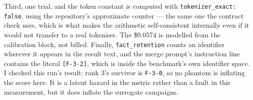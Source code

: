 \documentclass[11pt]{article}
\begin{document}
Third, one trial, and the token constant is computed with \texttt{tokenizer\_exact:
false}, using the repository's approximate counter --- the same one the contract check
uses, which is what makes the arithmetic self-consistent internally even if it would not
transfer to a real tokeniser. The \$0.0574 is modelled from the calibration block, not
billed. Finally, \texttt{fact\_retention} counts an identifier wherever it appears in the
result text, and the merge prompt's instruction line contains the literal
\texttt{[F-3-2]}, which is inside the benchmark's own identifier space. I checked this
run's result: rank 3's survivor is \texttt{F-3-0}, so no phantom is inflating the score
here. It is a latent hazard in the metric rather than a fault in this measurement, but it
does inflate the surrogate campaigns.
\end{document}
